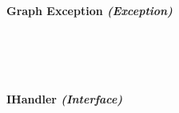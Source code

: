\begin{FlushLeft}
\begin{enumerate}
    \begin{figure}[H]
        \centering
    \end{figure}\\

    \bk

    \paragraph*{Graph Exception \textit{(Exception)}} \mbox{} \\

    \begin{figure}[H]
        \centering
    \end{figure}\\

    \bk

    \paragraph*{IHandler \textit{(Interface)}} \mbox{} \\


\end{enumerate}
\end{FlushLeft}
